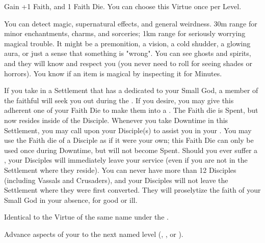 \begin{multicols*}{2}


Gain +1 \MAX Faith, and 1 Faith Die. You can choose this Virtue once per Level.



You can detect magic, supernatural effects, and general weirdness. 30m range for minor enchantments, charms, and sorceries; 1km range for seriously worrying magical trouble. It might be a premonition, a vision, a cold shudder, a glowing aura, or just a sense that something is "wrong". You can see ghosts and spirits, and they will know and respect you (you never need to roll \INSANITY for seeing shades or horrors). You know if an item is magical by inspecting it for Minutes.


If you take  in a Settlement that has a  dedicated to your Small God, a member of the faithful will seek you out during the .  If you desire, you may give this adherent one of your Faith Die to make them into a . The Faith die is Spent, but now resides inside of the Disciple.  Whenever you take Downtime in this Settlement, you may call upon your Disciple(s) to assist you in your . You may use the Faith die of a Disciple as if it were your own; this Faith Die can only be used once during Downtime, but will not become Spent. Should you ever suffer a , your Disciples will immediately leave your service (even if you are not in the Settlement where they reside). You can never have more than 12 Disciples (including Vassals and Crusaders), and your Disciples will not leave the Settlement where they were first converted. They will proselytize the faith of your Small God in your absence, for good or ill.


Identical to the Virtue of the same name under the .


Advance  aspects of your  to the next named level (\DEATH, \INJURY, or \INSANITY).


\end{multicols*}
